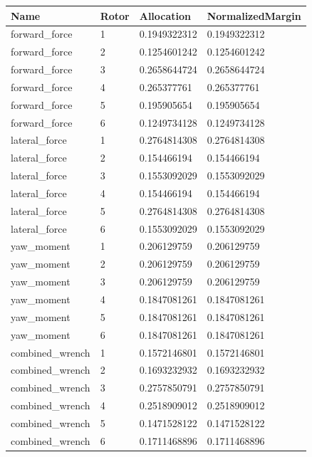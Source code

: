 \begin{tabular}{@{}llll@{}}
\toprule
Name & Rotor & Allocation & NormalizedMargin \\
\midrule
forward\_force & 1 & 0.1949322312 & 0.1949322312 \\
forward\_force & 2 & 0.1254601242 & 0.1254601242 \\
forward\_force & 3 & 0.2658644724 & 0.2658644724 \\
forward\_force & 4 & 0.265377761 & 0.265377761 \\
forward\_force & 5 & 0.195905654 & 0.195905654 \\
forward\_force & 6 & 0.1249734128 & 0.1249734128 \\
lateral\_force & 1 & 0.2764814308 & 0.2764814308 \\
lateral\_force & 2 & 0.154466194 & 0.154466194 \\
lateral\_force & 3 & 0.1553092029 & 0.1553092029 \\
lateral\_force & 4 & 0.154466194 & 0.154466194 \\
lateral\_force & 5 & 0.2764814308 & 0.2764814308 \\
lateral\_force & 6 & 0.1553092029 & 0.1553092029 \\
yaw\_moment & 1 & 0.206129759 & 0.206129759 \\
yaw\_moment & 2 & 0.206129759 & 0.206129759 \\
yaw\_moment & 3 & 0.206129759 & 0.206129759 \\
yaw\_moment & 4 & 0.1847081261 & 0.1847081261 \\
yaw\_moment & 5 & 0.1847081261 & 0.1847081261 \\
yaw\_moment & 6 & 0.1847081261 & 0.1847081261 \\
combined\_wrench & 1 & 0.1572146801 & 0.1572146801 \\
combined\_wrench & 2 & 0.1693232932 & 0.1693232932 \\
combined\_wrench & 3 & 0.2757850791 & 0.2757850791 \\
combined\_wrench & 4 & 0.2518909012 & 0.2518909012 \\
combined\_wrench & 5 & 0.1471528122 & 0.1471528122 \\
combined\_wrench & 6 & 0.1711468896 & 0.1711468896 \\
\bottomrule
\end{tabular}

